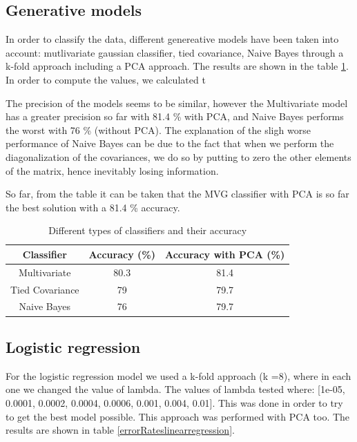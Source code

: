 \documentclass[twoside,a4paper,12pt]{report}
\begin{document}
\subsection{Generative models}

In order to classify the data, different genereative models have been taken into account:
mutlivariate gaussian classifier, tied covariance, Naive Bayes through a k-fold approach including a PCA approach.
 The results are shown in the table \ref{diffTypesclass}. In order to compute the values, we calculated t
 
 The precision of the models seems to be similar, however the Multivariate  model has a
 greater precision so far with 81.4 \% with PCA, and Naive Bayes performs the worst with 76 \% (without PCA). 
 The explanation of the sligh worse performance of Naive Bayes  can be due to the fact that when we 
 perform the diagonalization of the covariances, we do so by putting to zero the other elements
  of the matrix, hence inevitably losing information. 

 So far, from the table it can be taken that the MVG classifier with PCA is so far the best solution with
  a 81.4 \% accuracy.

\begin{table}[H]
\centering
 \begin{tabular}{||c c c||} 
    \hline \hline
    Classifier & Accuracy (\%) & Accuracy with PCA (\%)\\
    \hline\hline
    Multivariate & 80.3 & 81.4  \\ 
    \hline
    Tied Covariance & 79 & 79.7  \\
    \hline
    Naive Bayes & 76 & 79.7 \\
    \hline \hline
\end{tabular}
\label{diffTypesclass}
\caption{Different types of classifiers and their accuracy}
\end{table}


\subsection{Logistic regression}
For the logistic regression model we used  a k-fold approach (k =8), where in each 
one we changed the value of lambda. The values of lambda tested where: 
[1e-05, 0.0001, 0.0002, 0.0004, 0.0006, 0.001, 0.004, 0.01]. 
This was done in order to try to get the best model possible.
 This approach was performed with PCA too.
The results are shown in table \ref{errorRateslinearregression}.
\end{document}
